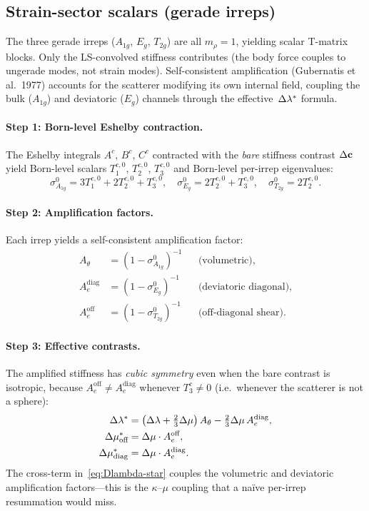 \subsection{Strain-sector scalars (gerade irreps)}
\label{sec:strain-sector}

The three gerade irreps ($A_{1g}$, $E_g$, $T_{2g}$) are all
$m_\rho = 1$, yielding scalar T-matrix blocks.  Only the
LS-convolved stiffness contributes (the body force couples to
ungerade modes, not strain modes).  Self-consistent amplification
(Gubernatis et al.\ 1977) accounts for the scatterer modifying its
own internal field, coupling the bulk ($A_{1g}$) and deviatoric
($E_g$) channels through the effective~$\Delta\lambda^*$ formula.

\paragraph{Step 1: Born-level Eshelby contraction.}
The Eshelby integrals $A^c$, $B^c$, $C^c$ contracted with the
\emph{bare} stiffness contrast $\Delta\mathbf{c}$ yield Born-level
scalars $T_1^{c,0}$, $T_2^{c,0}$, $T_3^{c,0}$ and Born-level
per-irrep eigenvalues:
\begin{equation}
  \sigma_{A_{1g}}^0 = 3T_1^{c,0} + 2T_2^{c,0} + T_3^{c,0}, \quad
  \sigma_{E_g}^0 = 2T_2^{c,0} + T_3^{c,0}, \quad
  \sigma_{T_{2g}}^0 = 2T_2^{c,0}.
  \label{eq:born-sigma-irrep}
\end{equation}

\paragraph{Step 2: Amplification factors.}
Each irrep yields a self-consistent amplification factor:
\begin{align}
  A_\theta     &= (1 - \sigma_{A_{1g}}^0)^{-1}  &&\text{(volumetric)}, \\
  A_e^{\text{diag}} &= (1 - \sigma_{E_g}^0)^{-1} &&\text{(deviatoric diagonal)}, \\
  A_e^{\text{off}}  &= (1 - \sigma_{T_{2g}}^0)^{-1} &&\text{(off-diagonal shear)}.
\end{align}

\paragraph{Step 3: Effective contrasts.}
The amplified stiffness has \emph{cubic symmetry} even when the bare
contrast is isotropic, because $A_e^{\text{off}} \neq A_e^{\text{diag}}$
whenever $T_3^c \neq 0$ (i.e.\ whenever the scatterer is not a sphere):
\begin{align}
  \Delta\lambda^* &= \big(\Delta\lambda + \tfrac{2}{3}\Delta\mu\big)\,A_\theta
    - \tfrac{2}{3}\Delta\mu\,A_e^{\text{diag}},
    \label{eq:Dlambda-star} \\
  \Delta\mu^*_{\text{off}}  &= \Delta\mu \cdot A_e^{\text{off}}, \\
  \Delta\mu^*_{\text{diag}} &= \Delta\mu \cdot A_e^{\text{diag}}.
\end{align}
The cross-term in~\eqref{eq:Dlambda-star} couples the volumetric
and deviatoric amplification factors---this is the $\kappa$--$\mu$
coupling that a na\"ive per-irrep resummation would miss.

